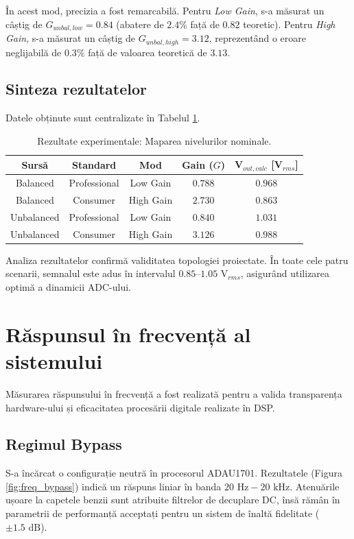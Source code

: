 În acest mod, precizia a fost remarcabilă. Pentru \textit{Low Gain}, s-a măsurat un câștig de $G_{unbal,low} = 0.84$ (abatere de $2.4\%$ față de $0.82$ teoretic). Pentru \textit{High Gain}, s-a măsurat un câștig de $G_{unbal,high} = 3.12$, reprezentând o eroare neglijabilă de $0.3\%$ față de valoarea teoretică de $3.13$.

\subsection{Sinteza rezultatelor}
Datele obținute sunt centralizate în Tabelul \ref{tab:masuratori_gain}.

\begin{table}[htbp]
    \centering
    \caption{Rezultate experimentale: Maparea nivelurilor nominale.}
    \label{tab:masuratori_gain}
    \begin{tabular}{@{}ccccc@{}}
    \toprule
    \textbf{Sursă} & \textbf{Standard} & \textbf{Mod} & \textbf{Gain ($G$)} & \textbf{V$_{out,calc}$ [V$_{rms}$]} \\ \midrule
    Balanced & Professional & Low Gain & $0.788$ & $0.968$ \\
    Balanced & Consumer & High Gain & $2.730$ & $0.863$ \\
    Unbalanced & Professional & Low Gain & $0.840$ & $1.031$ \\
    Unbalanced & Consumer & High Gain & $3.126$ & $0.988$ \\
    \bottomrule
    \end{tabular}
\end{table}

Analiza rezultatelor confirmă validitatea topologiei proiectate. În toate cele patru scenarii, semnalul este adus în intervalul $0.85\text{--}1.05\text{ V}_{rms}$, asigurând utilizarea optimă a dinamicii ADC-ului.

\section{Răspunsul în frecvență al sistemului}

Măsurarea răspunsului în frecvență a fost realizată pentru a valida transparența hardware-ului și eficacitatea procesării digitale realizate în DSP.

\subsection{Regimul Bypass}
S-a încărcat o configurație neutră în procesorul ADAU1701. Rezultatele (Figura \ref{fig:freq_bypass}) indică un răspuns liniar în banda $20\text{ Hz} - 20\text{ kHz}$. Atenuările ușoare la capetele benzii sunt atribuite filtrelor de decuplare DC, însă rămân în parametrii de performanță acceptați pentru un sistem de înaltă fidelitate ($\pm 1.5\text{ dB}$).

